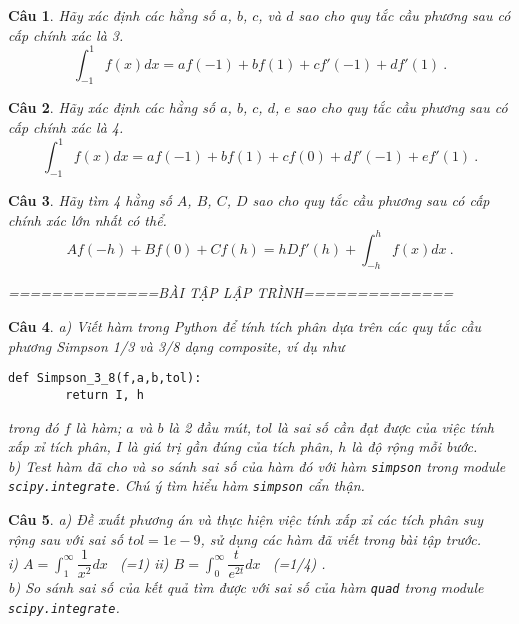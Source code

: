 \documentclass[11pt]{article}
\newtheorem{bt}{Câu}
\begin{document}
\begin{bt} %
	Hãy xác định các hằng số $a$, $b$, $c$, và $d$ sao cho quy tắc cầu phương sau có cấp chính xác là 3.
	\[ \int_{-1}^{1} f(x) dx = a f(-1) + bf (1) + cf'(-1) + df'(1) \ .
	\]
\end{bt}

\begin{bt}
	Hãy xác định các hằng số $a$, $b$, $c$, $d$, $e$ sao cho quy tắc cầu phương sau có cấp chính xác là 4.
	\[  \int_{-1}^{1} f(x) dx = a f(-1) + bf (1) + cf(0) + d f'(-1) + e f'(1) \ .  \]
\end{bt}

\begin{bt}
	Hãy tìm 4 hằng số $A$, $B$, $C$, $D$ sao cho quy tắc cầu phương sau có cấp chính xác lớn nhất có thể. 
	\[  Af(-h) + B f(0) + C f(h) = hDf'(h) + \int_{-h}^{h} f(x) dx \ .
	\]

\begin{center}
	==============BÀI TẬP LẬP TRÌNH============== \\
\end{center}
\end{bt}

\begin{bt} a) Viết hàm trong Python để tính tích phân dựa trên các quy tắc cầu phương Simpson 1/3 và 3/8 dạng composite, ví dụ như
	\begin{lstlisting}[frame=single] 
		def Simpson_3_8(f,a,b,tol):
		return I, h
	\end{lstlisting}
trong đó $f$ là hàm; $a$ và $b$ là 2 đầu mút, $tol$ là sai số cần đạt được của việc tính xấp xỉ tích phân, $I$ là giá trị gần đúng của tích phân, $h$ là độ rộng mỗi bước. \\
b) Test hàm đã cho và so sánh sai số của hàm đó với hàm \verb|simpson| trong module \verb|scipy.integrate|. Chú ý tìm hiểu hàm \verb|simpson| cẩn thận.
\end{bt}

\begin{bt}\label{bt4} 
a) Đề xuất phương án và thực hiện việc tính xấp xỉ các tích phân suy rộng sau với sai số $tol = 1e-9$, sử dụng các hàm đã viết trong bài tập trước. \\
i) $A = \int_{1}^{\infty} \dfrac{1}{x^2} dx$ \ (=1) \hskip 2cm  ii) $B = \int_{0}^{\infty} \dfrac{t}{e^{2t}} dx$ \ (=1/4) . \\
b) So sánh sai số của kết quả tìm được với sai số của hàm \verb|quad| trong module \verb|scipy.integrate|.
\end{bt}
\end{document}
